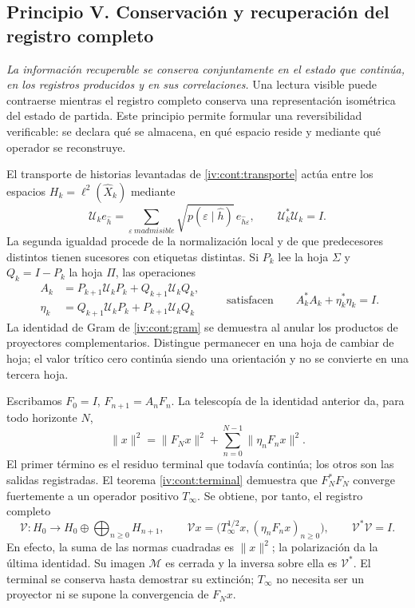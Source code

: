 \subsection*{Principio V. Conservación y recuperación del registro completo}
\hypertarget{prinh:conservacion}{}

\emph{La información recuperable se conserva conjuntamente en el estado
que continúa, en los registros producidos y en sus correlaciones.} Una
lectura visible puede contraerse mientras el registro completo conserva una
representación isométrica del estado de partida. Este principio permite
formular una reversibilidad verificable: se declara qué se almacena, en qué
espacio reside y mediante qué operador se reconstruye.

El transporte de historias levantadas de \cref{iv:cont:transporte} actúa
entre los espacios \(H_k=\ell^2(\widehat X_k)\) mediante
\[
 \mathcal U_ke_{\widehat h}=
 \sum_{\varepsilon\ {
m admisible}}
 \sqrt{p(\varepsilon\mid\widehat h)}\,
 e_{\widehat h\varepsilon},\qquad
 \mathcal U_k^*\mathcal U_k=I.
\]
La segunda igualdad procede de la normalización local y de que predecesores
distintos tienen sucesores con etiquetas distintas. Si \(P_k\) lee la hoja
\(\Sigma\) y \(Q_k=I-P_k\) la hoja \(\Pi\), las operaciones
\[
 \begin{aligned}
 A_k&=P_{k+1}\mathcal U_kP_k+Q_{k+1}\mathcal U_kQ_k,\\
 \eta_k&=Q_{k+1}\mathcal U_kP_k+P_{k+1}\mathcal U_kQ_k
 \end{aligned}
 \qquad\text{satisfacen}\qquad A_k^*A_k+\eta_k^*\eta_k=I.
\]
La identidad de Gram de \cref{iv:cont:gram} se demuestra al anular los
productos de proyectores complementarios. Distingue permanecer en una
hoja de cambiar de hoja; el valor trítico cero continúa siendo una
orientación y no se convierte en una tercera hoja.

Escribamos \(F_0=I\), \(F_{n+1}=A_nF_n\). La telescopía de la
identidad anterior da, para todo horizonte \(N\),
\[
 \|x\|^2=\|F_Nx\|^2+
                 \sum_{n=0}^{N-1}\|\eta_nF_nx\|^2.
\]
El primer término es el residuo terminal que todavía continúa; los otros
son las salidas registradas. El teorema \cref{iv:cont:terminal} demuestra
que \(F_N^*F_N\) converge fuertemente a un operador positivo
\(T_\infty\). Se obtiene, por tanto, el registro completo
\[
 \mathcal V:H_0\longrightarrow H_0\oplus
                     \bigoplus_{n\geq0}H_{n+1},\qquad
 \mathcal Vx=\bigl(T_\infty^{1/2}x,
                         (\eta_nF_nx)_{n\geq0}\bigr),
 \qquad\mathcal V^*\mathcal V=I.
\]
En efecto, la suma de las normas cuadradas es \(\|x\|^2\); la
polarización da la última identidad. Su imagen \(\mathcal M\) es
cerrada y la inversa sobre ella es \(\mathcal V^*\). El terminal se
conserva hasta demostrar su extinción; \(T_\infty\) no necesita ser
un proyector ni se supone la convergencia de \(F_Nx\).

